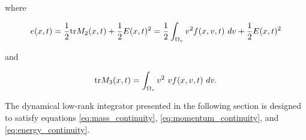 where 

\begin{equation}
    e(x, t) = \frac{1}{2} \text{tr} M_2 (x, t) + \frac{1}{2} E(x, t)^2
    = \frac{1}{2} \int_{\Omega_v} v^2 f(x, v, t)\ dv + \frac{1}{2} E(x, t)^2  
\end{equation}

and 

\begin{equation}
    \trace M_3 (x, t) = \int_{\Omega_v} v^2\ v f(x, v, t)\ dv . 
\end{equation}

The dynamical low-rank integrator presented in the following section is designed to 
satisfy equations \ref{eq:mass_continuity}, \ref{eq:momentum_continuity}, and 
\ref{eq:energy_continuity}. 


